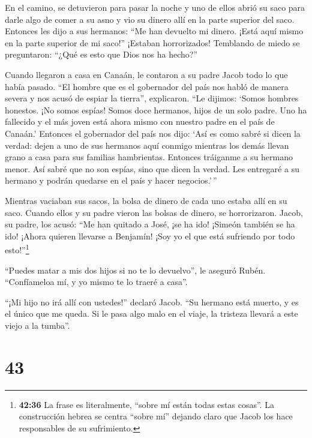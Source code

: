  En el camino, se detuvieron para pasar la noche y uno de
ellos abrió su saco para darle algo de comer a su asno y vio su dinero
allí en la parte superior del saco.  Entonces les dijo a
sus hermanos: ``Me han devuelto mi dinero. ¡Está aquí mismo en la parte
superior de mi saco!'' ¡Estaban horrorizados! Temblando de miedo se
preguntaron: ``¿Qué es esto que Dios nos ha hecho?''

 Cuando llegaron a casa en Canaán, le contaron a su padre
Jacob todo lo que había pasado.  ``El hombre que es el
gobernador del país nos habló de manera severa y nos acusó de espiar la
tierra'', explicaron.  ``Le dijimos: `Somos hombres
honestos. ¡No somos espías!  Somos doce hermanos, hijos de
un solo padre. Uno ha fallecido y el más joven está ahora mismo con
nuestro padre en el país de Canaán.'  Entonces el
gobernador del país nos dijo: `Así es como sabré si dicen la verdad:
dejen a uno de sus hermanos aquí conmigo mientras los demás llevan grano
a casa para sus familias hambrientas.  Entonces tráiganme a
su hermano menor. Así sabré que no son espías, sino que dicen la verdad.
Les entregaré a su hermano y podrán quedarse en el país y hacer
negocios.'\,''

 Mientras vaciaban sus sacos, la bolsa de dinero de cada
uno estaba allí en su saco. Cuando ellos y su padre vieron las bolsas de
dinero, se horrorizaron.  Jacob, su padre, los acusó: ``Me
han quitado a José, ¡se ha ido! ¡Simeón también se ha ido! ¡Ahora
quieren llevarse a Benjamín! ¡Soy yo el que está sufriendo por todo
esto!''\footnote{\textbf{42:36} La frase es literalmente, ``sobre mí
  están todas estas cosas''. La construcción hebrea se centra ``sobre
  mí'' dejando claro que Jacob los hace responsables de su sufrimiento.}

 ``Puedes matar a mis dos hijos si no te lo devuelvo'', le
aseguró Rubén. ``Confíameloa mí, y yo mismo te lo traeré a casa''.

 ``¡Mi hijo no irá allí con ustedes!'' declaró Jacob. ``Su
hermano está muerto, y es el único que me queda. Si le pasa algo malo en
el viaje, la tristeza llevará a este viejo a la tumba''.

\hypertarget{section-42}{%
\section{43}\label{section-42}}

